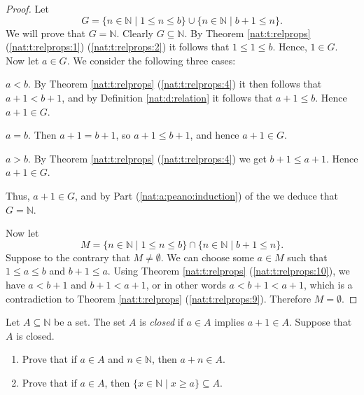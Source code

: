 \begin{proof}
	Let
	\[
		G = \{n \in \mathbb{N} \mid 1 \leq n \leq b\} \cup\{n \in \mathbb{N} \mid b+1 \leq n\}.
	\]
	We will prove that $G = \mathbb{N}$. Clearly $G \subseteq \mathbb{N}$. By Theorem \ref{nat:t:relprops} (\ref{nat:t:relprops:1}) (\ref{nat:t:relprops:2}) it follows that $1 \leq 1 \leq b$. Hence, $1 \in G$. Now let $a \in G$. We consider the following three cases:
	\begin{bycases}
		\item $a < b$. By Theorem \ref{nat:t:relprops} (\ref{nat:t:relprops:4}) it then follows that $a + 1 < b + 1$, and by Definition \ref{nat:d:relation} it follows that $a + 1 \leq b$. Hence $a + 1 \in G$.
		\item $a = b$. Then $a + 1 = b + 1$, so $a + 1 \leq b + 1$, and hence $a + 1 \in G$.
		\item $a > b$. By Theorem \ref{nat:t:relprops} (\ref{nat:t:relprops:4}) we get $b + 1 \leq a + 1$. Hence $a + 1 \in G$.
	\end{bycases}
	Thus, $a + 1 \in G$, and by Part (\ref{nat:a:peano:induction}) of the  we deduce that $G = \mathbb{N}$.

	Now let
	\[
		M = \{n \in \mathbb{N} \mid 1 \leq n \leq b\} \cap\{n \in \mathbb{N} \mid b+1 \leq n\}.
	\]
	Suppose to the contrary that $M \not= \emptyset$. We can choose some $a \in M$ such that $1 \leq a \leq b$ and $b + 1 \leq a$. Using Theorem \ref{nat:t:relprops} (\ref{nat:t:relprops:10}), we have $a < b + 1$ and $b + 1 < a + 1$, or in other words $a < b + 1 < a + 1$, which is a contradiction to Theorem \ref{nat:t:relprops} (\ref{nat:t:relprops:9}). Therefore $M = \emptyset$.
\end{proof}


\Newpage
\begin{exercise} %
	Let $A \subseteq \mathbb{N}$ be a set. The set $A$ is \emph{closed} if $a \in A$ implies $a + 1 \in A$. Suppose that $A$ is closed.
	\begin{enumerate}
		\item \label{nat:e:7:1}
		      Prove that if $a \in A$ and $n \in \mathbb{N}$, then $a +n  \in A$.
		\item \label{nat:e:7:2}
		      Prove that if $a \in A$, then $\{x \in \mathbb{N} \mid x \geq a\} \subseteq A$.
	\end{enumerate}
\end{exercise}

